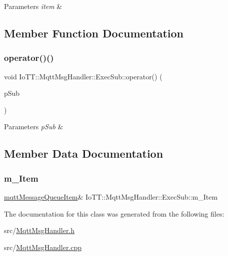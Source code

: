 \begin{DoxyParams}{Parameters}
{\em item} & \\
\hline
\end{DoxyParams}


\subsection{Member Function Documentation}
\mbox{\label{classIoTT_1_1MqttMsgHandler_1_1ExecSub_a2fd3aebce216568e4117c0841ef68718}} 
\subsubsection{\texorpdfstring{operator()()}{operator()()}}
{\footnotesize\ttfamily void Io\+T\+T\+::\+Mqtt\+Msg\+Handler\+::\+Exec\+Sub\+::operator() (\begin{DoxyParamCaption}\item[{\hyperlink{classIoTT_1_1MqttSubscription}{Mqtt\+Subscription} $\ast$}]{p\+Sub }\end{DoxyParamCaption})}


\begin{DoxyParams}{Parameters}
{\em p\+Sub} & \\
\hline
\end{DoxyParams}


\subsection{Member Data Documentation}
\mbox{\label{classIoTT_1_1MqttMsgHandler_1_1ExecSub_aedecbc827f2898f0bbb8d2a1ba37b6d1}} 
\subsubsection{\texorpdfstring{m\+\_\+\+Item}{m\_Item}}
{\footnotesize\ttfamily \hyperlink{classIoTT_1_1mqttMessageQueueItem}{mqtt\+Message\+Queue\+Item}\& Io\+T\+T\+::\+Mqtt\+Msg\+Handler\+::\+Exec\+Sub\+::m\+\_\+\+Item\hspace{0.3cm}{\ttfamily [private]}}



The documentation for this class was generated from the following files\+:\begin{DoxyCompactItemize}
\item 
src/\hyperlink{MqttMsgHandler_8h}{Mqtt\+Msg\+Handler.\+h}\item 
src/\hyperlink{MqttMsgHandler_8cpp}{Mqtt\+Msg\+Handler.\+cpp}\end{DoxyCompactItemize}
